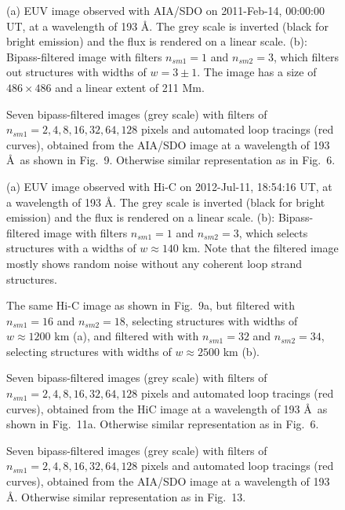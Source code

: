 \documentclass[10pt,preprint]{aastex}  %
\def\ang{\AA}
\begin{document}
\begin{figure}
\caption{(a) EUV image observed with AIA/SDO on 2011-Feb-14, 00:00:00 UT,
at a wavelength of 193 \ang . The grey scale is inverted (black for
bright emission) and the flux is rendered on a linear scale.
(b): Bipass-filtered image with filters $n_{sm1}=1$ and
$n_{sm2}=3$, which filters out structures with widths of 
$w = 3 \pm 1$. The image has a size of $486 \times 486$ and
a linear extent of 211 Mm.}
\end{figure}

\begin{figure}
\caption{Seven bipass-filtered images (grey scale) with filters of
$n_{sm1}=2, 4, 8, 16, 32, 64, 128$ pixels and automated loop tracings
(red curves), obtained from the AIA/SDO image at a wavelength of 
193 \ang\ as shown in Fig.~9. Otherwise similar representation 
as in Fig.~6.}
\end{figure}

\begin{figure}
\caption{(a) EUV image observed with Hi-C on 2012-Jul-11, 18:54:16 UT,
at a wavelength of 193 \ang . The grey scale is inverted (black for
bright emission) and the flux is rendered on a linear scale.
(b): Bipass-filtered image with filters $n_{sm1}=1$ and
$n_{sm2}=3$, which selects structures with a widths of 
$w \approx 140$ km. Note that the filtered image mostly shows
random noise without any coherent loop strand structures.}
\end{figure}

\begin{figure}
\caption{The same Hi-C image as shown in Fig.~9a, but filtered
with $n_{sm1}=16$ and $n_{sm2}=18$, selecting structures with
widths of $w \approx 1200$ km (a), and filtered with 
with $n_{sm1}=32$ and $n_{sm2}=34$, selecting structures with
widths of $w \approx 2500$ km (b).}  
\end{figure}

\begin{figure}
\caption{Seven bipass-filtered images (grey scale) with filters of
$n_{sm1}=2, 4, 8, 16, 32, 64, 128$ pixels and automated loop tracings
(red curves), obtained from the HiC image at a wavelength of 
193 \ang\ as shown in Fig.~11a. Otherwise similar representation 
as in Fig.~6.}
\end{figure}

\begin{figure}
\caption{Seven bipass-filtered images (grey scale) with filters of
$n_{sm1}=2, 4, 8, 16, 32, 64, 128$ pixels and automated loop tracings
(red curves), obtained from the AIA/SDO image at a wavelength of 
193 \ang . Otherwise similar representation as in Fig.~13.}
\end{figure}
\end{document}
